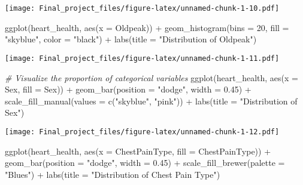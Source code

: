 \documentclass[
]{article}
\newenvironment{Shaded}{\begin{snugshade}}{\end{snugshade}}
\newcommand{\AttributeTok}[1]{\textcolor[rgb]{0.77,0.63,0.00}{#1}}
\newcommand{\CommentTok}[1]{\textcolor[rgb]{0.56,0.35,0.01}{\textit{#1}}}
\newcommand{\DecValTok}[1]{\textcolor[rgb]{0.00,0.00,0.81}{#1}}
\newcommand{\FloatTok}[1]{\textcolor[rgb]{0.00,0.00,0.81}{#1}}
\newcommand{\FunctionTok}[1]{\textcolor[rgb]{0.00,0.00,0.00}{#1}}
\newcommand{\NormalTok}[1]{#1}
\newcommand{\SpecialCharTok}[1]{\textcolor[rgb]{0.00,0.00,0.00}{#1}}
\newcommand{\StringTok}[1]{\textcolor[rgb]{0.31,0.60,0.02}{#1}}
\begin{document}
\texttt{[image: Final\_project\_files/figure-latex/unnamed-chunk-1-10.pdf]}

\begin{Shaded}
\begin{Highlighting}[]
\FunctionTok{ggplot}\NormalTok{(heart\_health, }\FunctionTok{aes}\NormalTok{(}\AttributeTok{x =}\NormalTok{ Oldpeak)) }\SpecialCharTok{+} 
  \FunctionTok{geom\_histogram}\NormalTok{(}\AttributeTok{bins =} \DecValTok{20}\NormalTok{, }\AttributeTok{fill =} \StringTok{"skyblue"}\NormalTok{, }\AttributeTok{color =} \StringTok{"black"}\NormalTok{) }\SpecialCharTok{+} 
  \FunctionTok{labs}\NormalTok{(}\AttributeTok{title =} \StringTok{"Distribution of Oldpeak"}\NormalTok{)}
\end{Highlighting}
\end{Shaded}

\texttt{[image: Final\_project\_files/figure-latex/unnamed-chunk-1-11.pdf]}

\begin{Shaded}
\begin{Highlighting}[]
\CommentTok{\# Visualize the proportion of categorical variables}
\FunctionTok{ggplot}\NormalTok{(heart\_health, }\FunctionTok{aes}\NormalTok{(}\AttributeTok{x =}\NormalTok{ Sex, }\AttributeTok{fill =}\NormalTok{ Sex)) }\SpecialCharTok{+}
  \FunctionTok{geom\_bar}\NormalTok{(}\AttributeTok{position =} \StringTok{"dodge"}\NormalTok{, }\AttributeTok{width =} \FloatTok{0.45}\NormalTok{) }\SpecialCharTok{+}
  \FunctionTok{scale\_fill\_manual}\NormalTok{(}\AttributeTok{values =} \FunctionTok{c}\NormalTok{(}\StringTok{"skyblue"}\NormalTok{, }\StringTok{"pink"}\NormalTok{)) }\SpecialCharTok{+}
  \FunctionTok{labs}\NormalTok{(}\AttributeTok{title =} \StringTok{"Distribution of Sex"}\NormalTok{)}
\end{Highlighting}
\end{Shaded}

\texttt{[image: Final\_project\_files/figure-latex/unnamed-chunk-1-12.pdf]}

\begin{Shaded}
\begin{Highlighting}[]
\FunctionTok{ggplot}\NormalTok{(heart\_health, }\FunctionTok{aes}\NormalTok{(}\AttributeTok{x =}\NormalTok{ ChestPainType, }\AttributeTok{fill =}\NormalTok{ ChestPainType)) }\SpecialCharTok{+}
  \FunctionTok{geom\_bar}\NormalTok{(}\AttributeTok{position =} \StringTok{"dodge"}\NormalTok{, }\AttributeTok{width =} \FloatTok{0.45}\NormalTok{) }\SpecialCharTok{+}
  \FunctionTok{scale\_fill\_brewer}\NormalTok{(}\AttributeTok{palette =} \StringTok{"Blues"}\NormalTok{) }\SpecialCharTok{+}
  \FunctionTok{labs}\NormalTok{(}\AttributeTok{title =} \StringTok{"Distribution of Chest Pain Type"}\NormalTok{)}
\end{Highlighting}
\end{Shaded}
\end{document}
